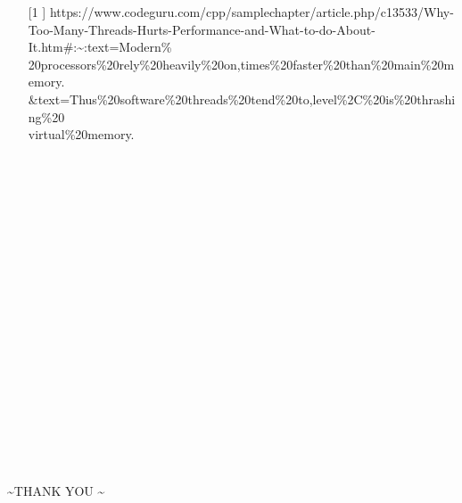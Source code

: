 \documentclass[paper=a4, fontsize = 12pt]{scrartcl}
\numberwithin{equation}{section}		%
\numberwithin{figure}{section}			%
\numberwithin{table}{section}				%
\begin{document}
\begin{itemize}
    \item [[1]]   https://www.codeguru.com/cpp/sample\textunderscore{}chapter/article.php/c13533/Why-Too-Many-Threads-Hurts-Performance-and-What-to-do-About-It.htm\#:\sim:text=Modern\%\\20processors\%20rely\%20heavily\%20on,times\%20faster\%20than\%20main\%20memory.\\\&text=Thus\%20software\%20threads\%20tend\%20to,level\%2C\%20is\%20thrashing\%20\\virtual\%20memory.
\end{itemize}\\\\\\\\\\\\\\\\\\\\\\\\\\\\\\\\\\\



\centerline{\huge  \sim THANK YOU \sim }








\end{document}
